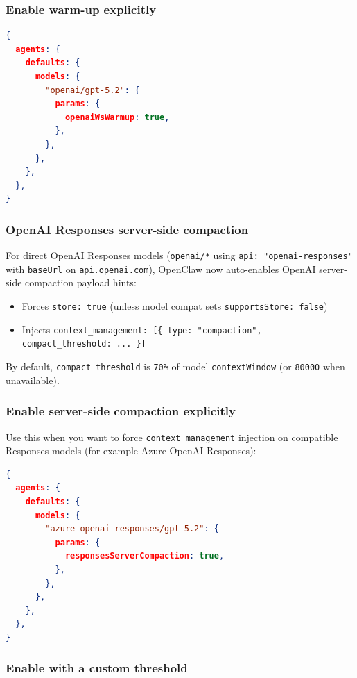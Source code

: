 \subsubsection{Enable warm-up explicitly}


\begin{lstlisting}[language=json]
{
  agents: {
    defaults: {
      models: {
        "openai/gpt-5.2": {
          params: {
            openaiWsWarmup: true,
          },
        },
      },
    },
  },
}
\end{lstlisting}


\subsubsection{OpenAI Responses server-side compaction}


For direct OpenAI Responses models (\texttt{openai/*} using \texttt{api: "openai-responses"} with
\texttt{baseUrl} on \texttt{api.openai.com}), OpenClaw now auto-enables OpenAI server-side
compaction payload hints:

\begin{itemize}
  \item Forces \texttt{store: true} (unless model compat sets \texttt{supportsStore: false})
  \item Injects \texttt{context\_management: [\{ type: "compaction", compact\_threshold: ... \}]}
\end{itemize}


By default, \texttt{compact\_threshold} is \texttt{70\%} of model \texttt{contextWindow} (or \texttt{80000}
when unavailable).

\subsubsection{Enable server-side compaction explicitly}


Use this when you want to force \texttt{context\_management} injection on compatible
Responses models (for example Azure OpenAI Responses):

\begin{lstlisting}[language=json]
{
  agents: {
    defaults: {
      models: {
        "azure-openai-responses/gpt-5.2": {
          params: {
            responsesServerCompaction: true,
          },
        },
      },
    },
  },
}
\end{lstlisting}


\subsubsection{Enable with a custom threshold}



